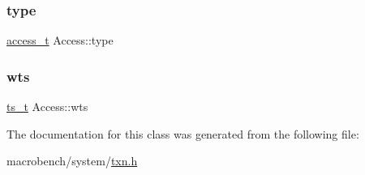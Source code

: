 \mbox{\label{classAccess_affd802962e0f6a7b5fe621db1557d2d5}} 
\subsubsection{\texorpdfstring{type}{type}}
{\footnotesize\ttfamily \hyperlink{global_8h_a567f81b0ae33b00d189d7714e9fde0bc}{access\+\_\+t} Access\+::type}

\mbox{\label{classAccess_a19794f7fefe6813eb7e6ed73534cc654}} 
\subsubsection{\texorpdfstring{wts}{wts}}
{\footnotesize\ttfamily \hyperlink{global_8h_aaf095dfc9b10f757c968fe146ad7e724}{ts\+\_\+t} Access\+::wts}



The documentation for this class was generated from the following file\+:\begin{DoxyCompactItemize}
\item 
macrobench/system/\hyperlink{txn_8h}{txn.\+h}\end{DoxyCompactItemize}
